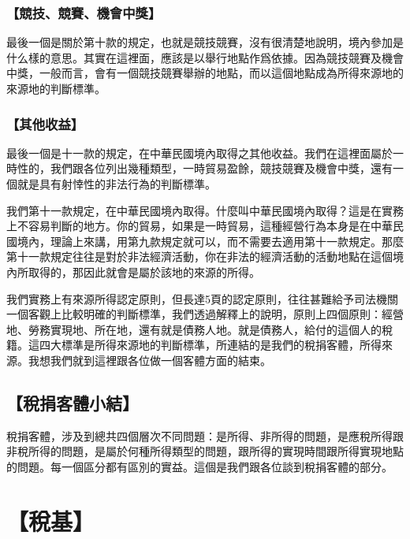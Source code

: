 \documentclass[oneside,sub3section]{ctexbook}
\begin{document}
\hypertarget{ux7af6ux6280ux7af6ux8cfdux6a5fux6703ux4e2dux734e}{%
\subsubsection{【競技、競賽、機會中獎】}\label{ux7af6ux6280ux7af6ux8cfdux6a5fux6703ux4e2dux734e}}

最後一個是關於第十款的規定，也就是競技競賽，沒有很清楚地說明，境內參加是什么樣的意思。其實在這裡面，應該是以舉行地點作爲依據。因為競技競賽及機會中獎，一般而言，會有一個競技競賽舉辦的地點，而以這個地點成為所得來源地的來源地的判斷標準。

\hypertarget{ux5176ux4ed6ux6536ux76ca}{%
\subsubsection{【其他收益】}\label{ux5176ux4ed6ux6536ux76ca}}

最後一個是十一款的規定，在中華民國境內取得之其他收益。我們在這裡面屬於一時性的，我們跟各位列出幾種類型，一時貿易盈餘，競技競賽及機會中獎，還有一個就是具有射悻性的非法行為的判斷標準。

我們第十一款規定，在中華民國境內取得。什麼叫中華民國境內取得？這是在實務上不容易判斷的地方。你的貿易，如果是一時貿易，這種經營行為本身是在中華民國境內，理論上來講，用第九款規定就可以，而不需要去適用第十一款規定。那麼第十一款規定往往是對於非法經濟活動，你在非法的經濟活動的活動地點在這個境內所取得的，那因此就會是屬於該地的來源的所得。

我們實務上有來源所得認定原則，但長達5頁的認定原則，往往甚難給予司法機關一個客觀上比較明確的判斷標準，我們透過解釋上的說明，原則上四個原則：經營地、勞務實現地、所在地，還有就是債務人地。就是債務人，給付的這個人的稅籍。這四大標準是所得來源地的判斷標準，所連結的是我們的稅捐客體，所得來源。我想我們就到這裡跟各位做一個客體方面的結束。

\hypertarget{ux7a05ux6350ux5ba2ux9ad4ux5c0fux7d50}{%
\subsection{【稅捐客體小結】}\label{ux7a05ux6350ux5ba2ux9ad4ux5c0fux7d50}}

稅捐客體，涉及到總共四個層次不同問題：是所得、非所得的問題，是應稅所得跟非稅所得的問題，是屬於何種所得類型的問題，跟所得的實現時間跟所得實現地點的問題。每一個區分都有區別的實益。這個是我們跟各位談到稅捐客體的部分。

\hypertarget{ux7a05ux57fa-1}{%
\section{【稅基】}\label{ux7a05ux57fa-1}}
\end{document}
